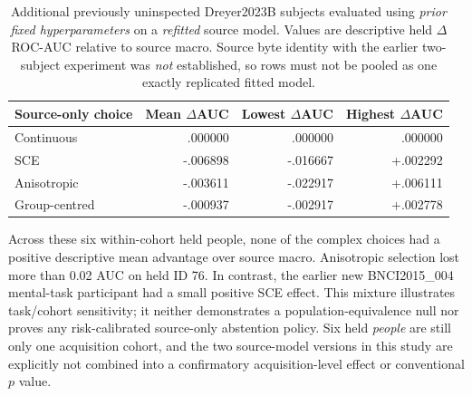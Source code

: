 \begin{table}[ht]\centering\small
\caption{Additional previously uninspected
Dreyer2023B subjects evaluated using \emph{prior
fixed hyperparameters} on a \emph{refitted} source
model. Values are descriptive held $\Delta$ROC-AUC
relative to source macro. Source byte identity with
the earlier two-subject experiment was \emph{not}
established, so rows must not be pooled as
one exactly replicated fitted model.}
\label{tab:p3-dreyerb-six}
\begin{tabular}{lrrr}
\toprule
Source-only choice & Mean $\Delta$AUC &
Lowest $\Delta$AUC & Highest $\Delta$AUC\\
\midrule
Continuous & .000000 & .000000 & .000000\\
SCE & -.006898 & -.016667 & +.002292\\
Anisotropic & -.003611 & -.022917 & +.006111\\
Group-centred & -.000937 & -.002917 & +.002778\\
\bottomrule
\end{tabular}
\end{table}
Across these six within-cohort held people,
none of the complex choices had a positive
descriptive mean advantage over source macro.
Anisotropic selection lost more than 0.02
AUC on held ID 76. In contrast, the
earlier new BNCI2015\_004 mental-task
participant had a small positive SCE
effect. This mixture illustrates
task/cohort sensitivity; it neither
demonstrates a population-equivalence
null nor proves any risk-calibrated
source-only abstention policy.
Six held \emph{people} are still only
one acquisition cohort, and the two
source-model versions in this study
are explicitly not combined into a
confirmatory acquisition-level
effect or conventional $p$ value.
